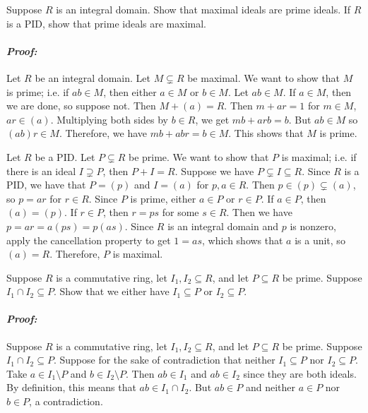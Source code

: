 \documentclass [12pt] {article}
\renewcommand{\it}[1]{\textit{{#1}}}
\newenvironment{problem}{\begin{tcolorbox}[title=Problem,colback=black!5!white,colframe=black!75!black]}{\end{tcolorbox}}
\newenvironment{response}{\begin{responseframe}\vspace{-10pt}\paragraph{\it{Proof:}}}{\end{responseframe}}
\begin{document}
\newpage
\begin{problem}
    Suppose $R$ is an integral domain. Show that maximal ideals are prime
    ideals. If $R$ is a PID, show that prime ideals are maximal.
\end{problem}
\begin{response}
    Let $R$ be an integral domain. Let $M\subsetneq R$ be maximal. We want to
    show that $M$ is prime; i.e. if $ab\in M$, then either $a\in M$ or $b\in M$.
    Let $ab\in M$. If $a\in M$, then we are done, so suppose not. Then
    $M+(a)=R$. Then $m+ar=1$ for $m\in M$, $ar\in (a)$. Multiplying both sides
    by $b\in R$, we get $mb+arb=b$. But $ab\in M$ so $(ab)r\in M$. Therefore, we
    have $mb+abr = b\in M$. This shows that $M$ is prime.
    \vspace{1em}

    Let $R$ be a PID. Let $P\subsetneq R$ be prime. We want to show that $P$ is
    maximal; i.e. if there is an ideal $I\supsetneq P$, then $P+I=R$. Suppose we
    have $P\subsetneq I\subseteq R$. Since $R$ is a PID, we have that $P=(p)$
    and $I=(a)$ for $p,a\in R$. Then $p\in (p)\subsetneq (a)$, so $p=ar$ for
    $r\in R$. Since $P$ is prime, either $a\in P$ or $r\in P$. If $a\in P$, then
    $(a)=(p)$. If $r\in P$, then $r=ps$ for some $s\in R$. Then we have
    $p=ar=a(ps)=p(as)$. Since $R$ is an integral domain and $p$ is nonzero,
    apply the cancellation property to get $1=as$, which shows that $a$ is a
    unit, so $(a)=R$. Therefore, $P$ is maximal.
\end{response}

\newpage
\begin{problem}
    Suppose $R$ is a commutative ring, let $I_1,I_2\subseteq R$, and let
    $P\subseteq R$ be prime. Suppose $I_1\cap I_2\subseteq P$. Show that we
    either have $I_1\subseteq P$ or $I_2\subseteq P$.
\end{problem}
\begin{response}
    Suppose $R$ is a commutative ring, let $I_1,I_2\subseteq R$, and let
    $P\subseteq R$ be prime. Suppose $I_1\cap I_2\subseteq P$. Suppose for the
    sake of contradiction that neither $I_1\subseteq P$ nor $I_2\subseteq P$.
    Take $a\in I_1\setminus P$ and $b\in I_2\setminus P$. Then $ab\in I_1$ and
    $ab\in I_2$ since they are both ideals. By definition, this means that
    $ab\in I_1\cap I_2$. But $ab\in P$ and neither $a\in P$ nor $b\in P$, a
    contradiction.
\end{response}
\end{document}
